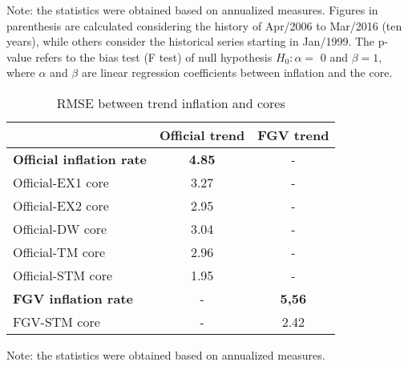 \documentclass[10pt]{article}
\begin{document}
\begin{table}[h]
\begin{threeparttable}
\begin{tabular}{@{}l|ccccc@{}}
\end{tabular}
\begin{tablenotes}
\item \scriptsize{Note: the statistics were obtained based on annualized measures. Figures in parenthesis are calculated considering the history of Apr/2006 to Mar/2016 (ten years), while others consider the historical series starting in Jan/1999. The p-value refers to the bias test (F test) of null hypothesis $H_0: \alpha = $ 0 and $\beta = 1$, where $\alpha$ and $\beta$ are linear regression coefficients between inflation and the core.}
\end{tablenotes}
\end{threeparttable}
\end{table}


\begin{table}[h]
\centering
\caption{RMSE between trend inflation and cores}\label{rmse_nucleos}
\begin{threeparttable}
\begin{tabular}{@{}l|cc@{}}
\toprule
           & \textbf{Official trend} & \textbf{FGV trend} \\ \midrule
\textbf{Official inflation rate} & \textbf{4.85}   & -      \\ 
Official-EX1 core       & 3.27   & -      \\
Official-EX2 core       & 2.95   & -      \\ 
Official-DW core        & 3.04   & -      \\
Official-TM core        & 2.96   & -      \\
Official-STM core       & 1.95   & -      \\ \midrule
\textbf{FGV inflation rate}      & -      & \textbf{5,56}      \\
FGV-STM core            & -      & 2.42      \\ \bottomrule
\end{tabular}
\begin{tablenotes}
\item \scriptsize{Note: the statistics were obtained based on annualized measures.}
\end{tablenotes}
\end{threeparttable}
\end{table}
\end{document}
